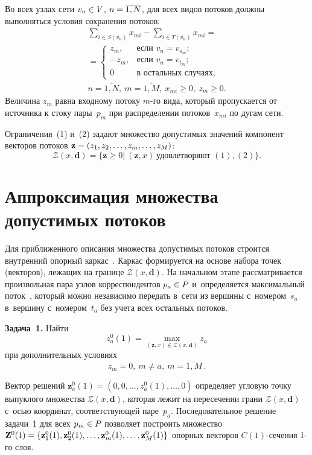 \begin{multicols}{2}
Во всех узлах сети $v_n \hm\in V$, $n \hm= \overline{1,N}$,  
для всех видов потоков должны выполняться условия сохранения потоков:
\begin{multline}
\sum\limits_{i \in S(v_n)}{x_{mi}} - \sum\limits_{i \in T(v_n)}{x_{mi}} ={}\\
{}=
\begin{cases}
 z_m, & \mbox{если } v_n = v_{s_m}; \\
- z_m, & \mbox{если } v_n = v_{t_m}; \\
 0 & \mbox{в\ остальных\ случаях,}
\end{cases}
\\
n = \overline {1, N}, \ m = \overline {1, M}, \ x_{mi} \ge 0, \ z_m \ge 0.
\label{e2-mal}
\end{multline}
Величина $z_m$ равна входному потоку $m$-го вида, который пропускается 
от источника к стоку пары~$p_m$ при распределении потоков~$x_{mi}$ 
по дугам сети.

Ограничения~(1) и~(2) задают множество  допустимых значений компонент 
векторов потоков
 $\mathbf{z} \hm= (z_1, z_2, \ldots, z_m, \ldots, z_M)$:
\begin{equation*}
\mathcal{Z}(x,\mathbf{ d}) = \{\mathbf{z} \ge 0 | \
(\mathbf{z}, x)\  \mbox{удовлетворяют } (1), (2)\}. 
\end{equation*}

\section{Аппроксимация множества допустимых потоков}

Для приближенного описания множества допустимых потоков 
строится внутренний опорный каркас~\cite{Dan}. Каркас формируется 
на основе набора точек (векторов), лежащих на границе 
$\mathcal{Z}(x,\mathbf{ d})$. На начальном этапе рассматривается 
произвольная пара узлов корреспондентов $p_a \hm\in P$ 
и~определяется максимальный поток~\cite{Yen}, который можно 
независимо передать в~сети из вершины с~номером~$s_a$ в~вершину 
с~номером~${t_a}$ без учета всех остальных потоков.

\smallskip

\noindent
\textbf{Задача~1.} Найти
$$ 
z_a^0 (1) = \max\limits_{(\mathbf{z}, x)  \in \mathcal{Z}(x, 
\mathbf{d})} z_a 
$$
при дополнительных условиях 
$$
z_m = 0,\ m \not = a,\ m = \overline {1, M}\,.$$

Вектор решений $\mathbf{z}_a^0(1) = (0, 0, \ldots, z_a^0 (1), \ldots, 0)$ 
определяет угловую точку выпуклого множества
$\mathcal{Z}(x,\mathbf{ d})$, которая лежит на пересечении грани 
$\mathcal{Z}(x,\mathbf{ d})$ с~осью координат, соответствующей паре~$p_a$. 
Последовательное решение задачи~1 для всех $p_m \hm\in P$ позволяет 
построить множество $\mathbf{Z}^0(1) \hm= \{\mathbf{z}_1^0(1),
 \mathbf{z}_2^0(1), \ldots, \mathbf{z}_m^0(1), \ldots, 
 \mathbf{z}_M^0(1) \}$ опорных векторов $C(1)$-се\-че\-ния 1-го слоя.


\end{multicols}
